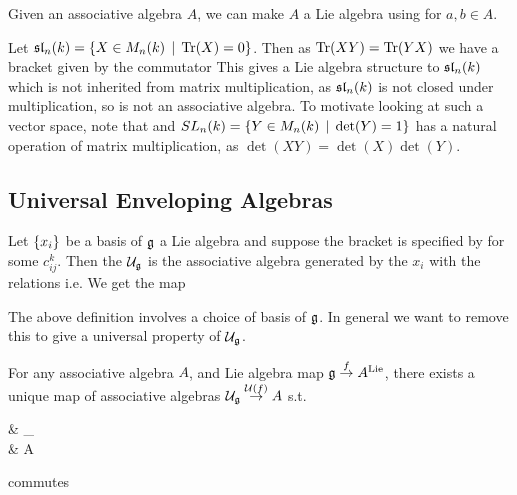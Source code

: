 \documentclass{article}
\begin{document}
\begin{example}
Given an associative algebra $A$, we can make $A$ a Lie algebra using 
for $a,b \in A$. 
\end{example}

\begin{example}
Let $\mathfrak{sl}_n(k) = \left\{ X \in M_n(k) \, \mid \, \operatorname{Tr}(X) = 0 \right\}$. Then as $\operatorname{Tr}(XY) = \operatorname{Tr}(YX)$ we have a bracket given by the commutator 
This gives a Lie algebra structure to $\mathfrak{sl}_n(k)$ which is not inherited from matrix multiplication, as $\mathfrak{sl}_n(k)$ is not closed under multiplication, so is not an associative algebra. To motivate looking at such a vector space, note that 
and $SL_n(k) = \left\{ Y \in M_n(k) \, \mid \, \det(Y) = 1 \right\}$ has a natural operation of matrix multiplication, as $\det(XY) = \det(X)\det(Y)$. 
\end{example}

\subsection{Universal Enveloping Algebras}

\begin{definition}
Let $\left\{ x_i \right\}$ be a basis of $\mathfrak{g}$ a Lie algebra and suppose the bracket is specified by 
for some  $c_{ij}^k$. Then the  $\mathcal{U}_{\mathfrak{g}}$ is the associative algebra generated by the $x_i$ with the relations 
i.e. 
We get the map 
\end{definition}


The above definition involves a choice of basis of $\mathfrak{g}$. In general we want to remove this to give a universal property of $\mathcal{U}_{\mathfrak{g}}$. 

\begin{prop}
For any associative algebra $A$, and Lie algebra map $\mathfrak{g} \overset{f}{\to} A^{\text{Lie}}$, there exists a unique map of associative algebras $\mathcal{U}_{\mathfrak{g}} \overset{\mathcal{U}(f)}{\to} A$ s.t. 
\begin{tkz}
& _ \arrow[d,"\mc{U}(f)"] \\
 \arrow[ur,"\iota"] \arrow[r,"f"] & A
\end{tkz}
commutes
\end{prop}
\end{document}

